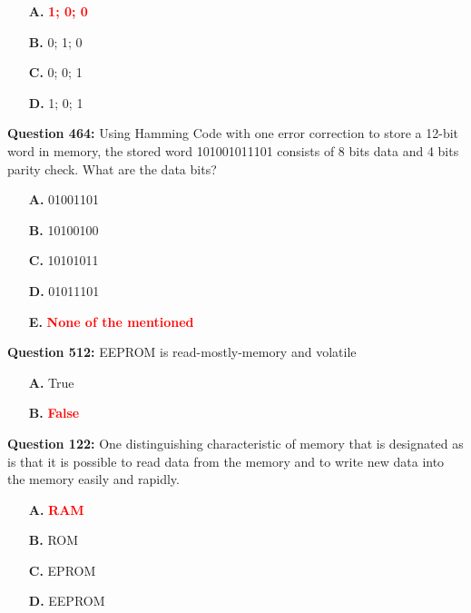 \documentclass[12pt,a4paper]{article}
\begin{document}
\begin{itemize}
    \item[\textbf{A.}] \textcolor{red}{\textbf{1; 0; 0}}
    \item[\textbf{B.}] 0; 1; 0
    \item[\textbf{C.}] 0; 0; 1
    \item[\textbf{D.}] 1; 0; 1
\end{itemize}

\vspace{0.5cm}

\vspace{0.5cm}

\textbf{Question 464:} Using Hamming Code with one error correction to store a 12-bit word in memory, the stored word 101001011101 consists of 8 bits data and 4 bits parity check. What are the data bits?

\begin{itemize}
    \item[\textbf{A.}] 01001101
    \item[\textbf{B.}] 10100100
    \item[\textbf{C.}] 10101011
    \item[\textbf{D.}] 01011101
    \item[\textbf{E.}] \textcolor{red}{\textbf{None of the mentioned}}
\end{itemize}

\vspace{0.5cm}

\vspace{0.5cm}

\textbf{Question 512:} EEPROM is read-mostly-memory and volatile

\begin{itemize}
    \item[\textbf{A.}] True
    \item[\textbf{B.}] \textcolor{red}{\textbf{False}}
\end{itemize}

\vspace{0.5cm}

\vspace{0.5cm}

\textbf{Question 122:} One distinguishing characteristic of memory that is designated as \underline{\hspace{1.5cm}} is that it is possible to read data from the memory and to write new data into the memory easily and rapidly.

\begin{itemize}
    \item[\textbf{A.}] \textcolor{red}{\textbf{RAM}}
    \item[\textbf{B.}] ROM
    \item[\textbf{C.}] EPROM
    \item[\textbf{D.}] EEPROM
\end{itemize}
\end{document}
